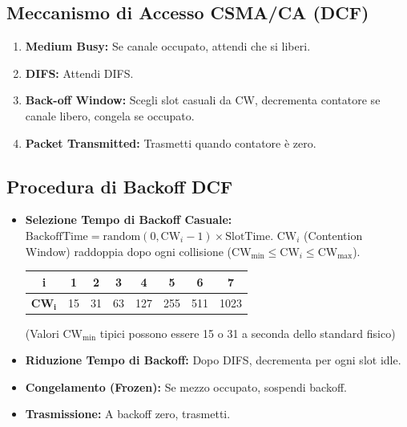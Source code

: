 \documentclass{article}
\begin{document}
\subsection{Meccanismo di Accesso CSMA/CA (DCF)}
\begin{enumerate}
    \item \textbf{Medium Busy:} Se canale occupato, attendi che si liberi.
    \item \textbf{DIFS:} Attendi DIFS.
    \item \textbf{Back-off Window:} Scegli slot casuali da CW, decrementa contatore se canale libero, congela se occupato.
    \item \textbf{Packet Transmitted:} Trasmetti quando contatore è zero.
\end{enumerate}

\subsection{Procedura di Backoff DCF}
\begin{itemize}
    \item \textbf{Selezione Tempo di Backoff Casuale:} $\text{BackoffTime} = \text{random}(0, \text{CW}_i - 1) \times \text{SlotTime}$.
    $\text{CW}_i$ (Contention Window) raddoppia dopo ogni collisione ($\text{CW}_{\min} \le \text{CW}_i \le \text{CW}_{\max}$).
    \begin{center}
    \begin{tabular}{|c|c|c|c|c|c|c|c|}
        \hline
        \textbf{i} & 1 & 2 & 3 & 4 & 5 & 6 & 7 \\ \hline
        $\mathbf{CW_i}$ & 15 & 31 & 63 & 127 & 255 & 511 & 1023 \\ \hline
    \end{tabular}
    \end{center}
    (Valori $\text{CW}_{\min}$ tipici possono essere 15 o 31 a seconda dello standard fisico)
    \item \textbf{Riduzione Tempo di Backoff:} Dopo DIFS, decrementa per ogni slot idle.
    \item \textbf{Congelamento (Frozen):} Se mezzo occupato, sospendi backoff.
    \item \textbf{Trasmissione:} A backoff zero, trasmetti.
\end{itemize}
\end{document}
